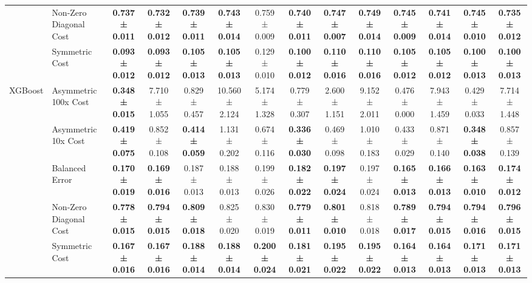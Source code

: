 \begin{table}[H]
{\begin{tabular}{llcccccccccccc}
 & Non-Zero Diagonal Cost & \textbf{0.737 ± 0.011} & \textbf{0.732 ± 0.012} & \textbf{0.739 ± 0.011} & \textbf{0.743 ± 0.014} & 0.759 ± 0.009 & \textbf{0.740 ± 0.011} & \textbf{0.747 ± 0.007} & \textbf{0.749 ± 0.014} & \textbf{0.745 ± 0.009} & \textbf{0.741 ± 0.014} & \textbf{0.745 ± 0.010} & \textbf{0.735 ± 0.012} \\
 & Symmetric Cost & \textbf{0.093 ± 0.012} & \textbf{0.093 ± 0.012} & \textbf{0.105 ± 0.013} & \textbf{0.105 ± 0.013} & 0.129 ± 0.010 & \textbf{0.100 ± 0.012} & \textbf{0.110 ± 0.016} & \textbf{0.110 ± 0.016} & \textbf{0.105 ± 0.012} & \textbf{0.105 ± 0.012} & \textbf{0.100 ± 0.013} & \textbf{0.100 ± 0.013} \\
\cline{1-14}
\multirow[t]{5}{*}{XGBoost} & Asymmetric 100x Cost & \textbf{0.348 ± 0.015} & 7.710 ± 1.055 & 0.829 ± 0.457 & 10.560 ± 2.124 & 5.174 ± 1.328 & 0.779 ± 0.307 & 2.600 ± 1.151 & 9.152 ± 2.011 & 0.476 ± 0.000 & 7.943 ± 1.459 & 0.429 ± 0.033 & 7.714 ± 1.448 \\
 & Asymmetric 10x Cost & \textbf{0.419 ± 0.075} & 0.852 ± 0.108 & \textbf{0.414 ± 0.059} & 1.131 ± 0.202 & 0.674 ± 0.116 & \textbf{0.336 ± 0.030} & 0.469 ± 0.098 & 1.010 ± 0.183 & 0.433 ± 0.029 & 0.871 ± 0.140 & \textbf{0.348 ± 0.038} & 0.857 ± 0.139 \\
 & Balanced Error & \textbf{0.170 ± 0.019} & \textbf{0.169 ± 0.016} & 0.187 ± 0.013 & 0.188 ± 0.013 & 0.199 ± 0.026 & \textbf{0.182 ± 0.022} & \textbf{0.197 ± 0.024} & 0.197 ± 0.024 & \textbf{0.165 ± 0.013} & \textbf{0.166 ± 0.013} & \textbf{0.163 ± 0.010} & \textbf{0.174 ± 0.012} \\
 & Non-Zero Diagonal Cost & \textbf{0.778 ± 0.015} & \textbf{0.794 ± 0.015} & \textbf{0.809 ± 0.018} & 0.825 ± 0.020 & 0.830 ± 0.019 & \textbf{0.779 ± 0.011} & \textbf{0.801 ± 0.010} & 0.818 ± 0.018 & \textbf{0.789 ± 0.017} & \textbf{0.794 ± 0.015} & \textbf{0.794 ± 0.016} & \textbf{0.796 ± 0.015} \\
 & Symmetric Cost & \textbf{0.167 ± 0.016} & \textbf{0.167 ± 0.016} & \textbf{0.188 ± 0.014} & \textbf{0.188 ± 0.014} & \textbf{0.200 ± 0.024} & \textbf{0.181 ± 0.021} & \textbf{0.195 ± 0.022} & \textbf{0.195 ± 0.022} & \textbf{0.164 ± 0.013} & \textbf{0.164 ± 0.013} & \textbf{0.171 ± 0.013} & \textbf{0.171 ± 0.013} \\
\cline{1-14}
\bottomrule
\end{tabular}
    }
\end{table}
